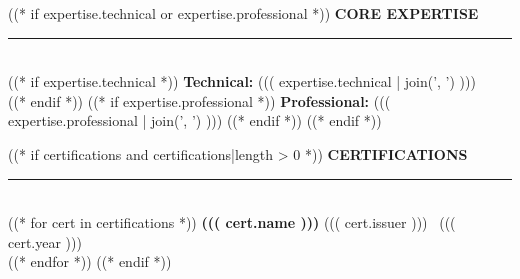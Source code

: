 \documentclass[11pt,a4paper]{article}
\begin{document}
\begin{minipage}[t]{0.62\textwidth}
\begin{minipage}[t]{0.88\textwidth}
((* if expertise.technical or expertise.professional *))
{\fontsize{12}{14}\selectfont\bfseries\color{black}\MakeUppercase{Core Expertise}}\\[2pt]
{\color{black}\rule{\linewidth}{1.5pt}}\\[8pt]
((* if expertise.technical *))
{\fontsize{9}{11}\selectfont\bfseries Technical:} {\fontsize{8.5}{11}\selectfont ((( expertise.technical | join(', ') )))}\\[6pt]
((* endif *))
((* if expertise.professional *))
{\fontsize{9}{11}\selectfont\bfseries Professional:} {\fontsize{8.5}{11}\selectfont ((( expertise.professional | join(', ') )))}
((* endif *))
\vspace{10pt}
((* endif *))

((* if certifications and certifications|length > 0 *))
{\fontsize{12}{14}\selectfont\bfseries\color{black}\MakeUppercase{Certifications}}\\[2pt]
{\color{black}\rule{\linewidth}{1.5pt}}\\[8pt]
((* for cert in certifications *))
{\fontsize{9}{11}\selectfont\bfseries ((( cert.name )))} \hfill {\fontsize{8}{10}\selectfont\color{muted} ((( cert.issuer ))) \textbar\ ((( cert.year )))}\\[4pt]
((* endfor *))
((* endif *))

\end{minipage}
\end{minipage}
\end{document}
